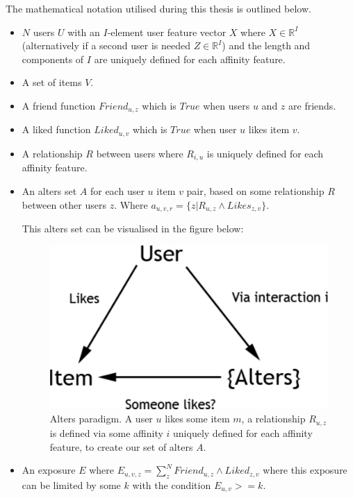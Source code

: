 The mathematical notation utilised during this thesis is outlined below.

\begin{itemize}
\item $N$ users $U$ with an $I$-element user feature vector $X$ where $X \in \mathbb{R}^I$ (alternatively if a second user is needed $Z \in \mathbb{R}^I$) 
and the length and components of $I$ are uniquely defined for each affinity feature.
\item A set of items $V$.
\item A friend function $Friend_{u,z}$ which is $True$ when users $u$ and $z$ are friends.
\item A liked function $Liked_{u,v}$ which is $True$ when user $u$ likes item $v$.
\item A relationship $R$ between users where $R_{i,u}$ is uniquely defined for each affinity feature.
\item An alters set $A$ for each user $u$ item $v$ pair, based on some relationship $R$ between other users $z$. 
Where $a_{u,v,r} = \{z | R_{u,z} \wedge Likes_{z,v}\}$.

\clearpage
This alters set can be visualised in the figure below:

\begin{figure}[tbh!]
	\begin{center}
		\includegraphics[scale=0.60]{imgs/alters.pdf}
		\caption{Alters paradigm. A user $u$ likes some item $m$, a relationship $R_{u,z}$ is defined via some affinity $i$ uniquely defined
		for each affinity feature, to create our set of alters $A$.}
	\end{center}
\end{figure}

\item An exposure $E$ where $E_{u,v,z} = \displaystyle\sum_{z}^{N} Friend_{u,z} \wedge Liked_{z,v}$ where this exposure can be 
limited by some $k$ with the condition $E_{u,v} >= k$.


\end{itemize}
